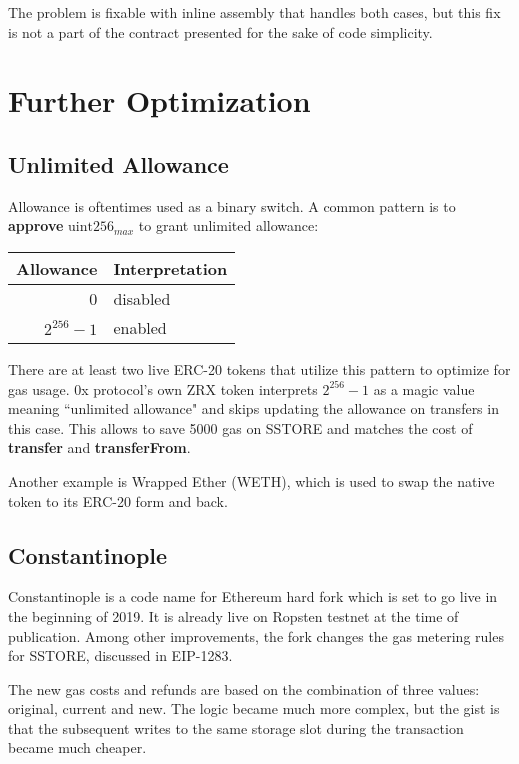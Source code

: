 \documentclass[12pt]{article}
\begin{document}
The problem is fixable with inline assembly that handles both cases, but this fix is not a part of the contract presented for the sake of code simplicity.


\section{Further Optimization}

\subsection{Unlimited Allowance}
Allowance is oftentimes used as a binary switch.
A common pattern is to \textbf{approve} $\text{uint256}_{max}$ to grant unlimited allowance:

\begin{center}	
\begin{tabular}{r l}
	Allowance & Interpretation \\ \hline
	0 & disabled \\
	$2^{256}-1$ & enabled
\end{tabular}
\end{center}

There are at least two live ERC-20 tokens that utilize this pattern to optimize for gas usage.
0x protocol's own ZRX token interprets $2^{256}-1$ as a magic value meaning ``unlimited allowance" and skips updating the allowance on transfers in this case\cite{zrx-unlimited}. This allows to save 5000 gas on SSTORE and matches the cost of \textbf{transfer} and \textbf{transferFrom}.

Another example is Wrapped Ether (WETH), which is used to swap the native token to its ERC-20 form and back.

\subsection{Constantinople}

Constantinople is a code name for Ethereum hard fork which is set to go live in the beginning of 2019.
It is already live on Ropsten testnet at the time of publication.
Among other improvements, the fork changes the gas metering rules for SSTORE,
discussed in EIP-1283\cite{eip1283}.

The new gas costs and refunds are based on the combination of three values: original, current and new.
The logic became much more complex, but the gist is that the subsequent writes to the same storage slot during the transaction became much cheaper.
\end{document}

